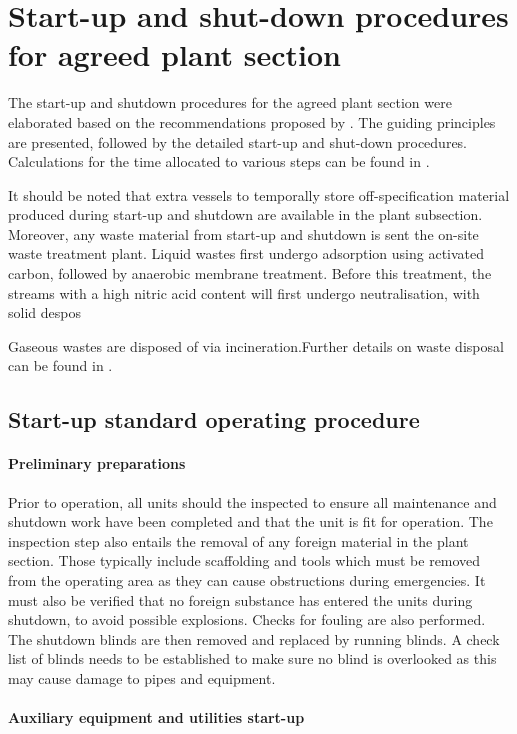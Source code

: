 \section{Start-up and shut-down procedures for agreed plant section}
The start-up and shutdown procedures for the agreed plant section were elaborated based on the recommendations proposed by \textcite{bp_international_safe_2006}. The guiding principles are presented, followed by the detailed start-up and shut-down procedures. Calculations for the time allocated to various steps can be found in .

It should be noted that extra vessels to temporally store off-specification material produced during start-up and shutdown are available in the plant subsection. Moreover, any waste material from start-up and shutdown is sent the on-site waste treatment plant. Liquid wastes first undergo adsorption using activated carbon, followed by anaerobic membrane treatment. Before this treatment, the streams with a high nitric acid content will first undergo neutralisation, with solid despos

Gaseous wastes are disposed of via incineration.Further details on waste disposal can be found in .

\subsection{Start-up standard operating procedure}

\paragraph{Preliminary preparations}
Prior to operation, all units should the inspected to ensure all maintenance and shutdown work have been completed and that the unit is fit for operation. The inspection step also entails the removal of any foreign material in the plant section. Those typically include scaffolding and tools which must be removed from the operating area as they can cause obstructions during emergencies. It must also be verified that no foreign substance has entered the units during shutdown, to avoid possible explosions. Checks for fouling are also performed. The shutdown blinds are then removed and replaced by running blinds. A check list of blinds needs to be established to make sure no blind is overlooked as this may cause damage to pipes and equipment.



\paragraph{Auxiliary equipment and utilities start-up}

